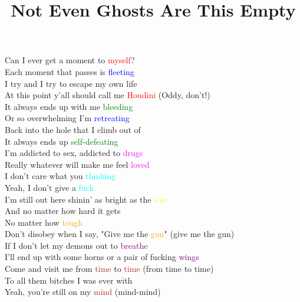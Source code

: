 \documentclass{article}
\begin{document}
\title{Not Even Ghosts Are This Empty}
\maketitle
Can I ever get a moment to \textcolor{red}{myself}? \\
Each moment that passes is \textcolor{blue}{fleeting} \\
I try and I try to escape my own life \\
At this point y'all should call me \textcolor{red}{Houdini} (Oddy, don't!) \\
It always ends up with me \textcolor{green}{bleeding} \\
Or so overwhelming I'm \textcolor{blue}{retreating} \\
Back into the hole that I climb out of \\
It always ends up \textcolor{green}{self-defeating} \\
I'm addicted to sex, addicted to \textcolor{magenta}{drugs} \\
Really whatever will make me feel \textcolor{magenta}{loved} \\
I don't care what you \textcolor{cyan}{thinking} \\
Yeah, I don't give a \textcolor{cyan}{fuck} \\
I'm still out here shinin' as bright as the \textcolor{yellow}{sun} \\
And no matter how hard it gets \\
No matter how \textcolor{orange}{tough} \\
Don't disobey when I say, "Give me the \textcolor{orange}{gun}" (give me the gun) \\
If I don't let my demons out to \textcolor{purple}{breathe} \\
I'll end up with some horns or a pair of fucking \textcolor{purple}{wings} \\
Come and visit me from \textcolor{brown}{time} to \textcolor{brown}{time} (from time to time) \\
To all them bitches I was ever with \\
Yeah, you're still on my \textcolor{brown}{mind} (mind-mind) \\
\end{document}
